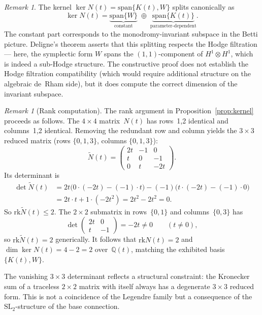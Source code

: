 \documentclass[11pt]{article}
\theoremstyle{plain}
\theoremstyle{definition}
\theoremstyle{remark}
\newtheorem{remark}[theorem]{Remark}
\newcommand{\Q}{\mathbb{Q}}
\newcommand{\rk}{\mathrm{rk}}
\begin{document}
\begin{remark}\label{rem:splitting}
The kernel $\ker N(t) = \mathrm{span}\{K(t), W\}$ splits
canonically as
\[
\ker N(t) = \underbrace{\mathrm{span}\{W\}}_{\text{constant}}
\;\oplus\;
\underbrace{\mathrm{span}\{K(t)\}}_{\text{parameter-dependent}}.
\]
The constant part corresponds to the monodromy-invariant
subspace in the Betti picture.  Deligne's theorem asserts
that this splitting respects the Hodge filtration --- here,
the symplectic form $W$ spans the $(1,1)$-component of
$H^1 \otimes H^1$, which is indeed a sub-Hodge structure.
The constructive proof does not establish the Hodge
filtration compatibility (which would require additional
structure on the algebraic de~Rham side), but it does
compute the correct dimension of the invariant subspace.
\end{remark}

\begin{remark}[Rank computation]\label{rem:rank}
The rank argument in Proposition~\ref{prop:kernel}
proceeds as follows.  The $4 \times 4$ matrix~$N(t)$
has rows~1,2 identical and columns~1,2 identical.
Removing the redundant row and column yields the
$3 \times 3$ reduced matrix (rows $\{0, 1, 3\}$,
columns $\{0, 1, 3\}$):
\[
\tilde{N}(t) =
\begin{pmatrix}
2t & -1 & 0 \\
t  & 0  & -1 \\
0  & t  & -2t
\end{pmatrix}.
\]
Its determinant is
\begin{align*}
\det \tilde{N}(t)
&= 2t \bigl(0 \cdot (-2t) - (-1) \cdot t\bigr)
 - (-1)\bigl(t \cdot (-2t) - (-1) \cdot 0\bigr) \\
&= 2t \cdot t + 1 \cdot (-2t^2) = 2t^2 - 2t^2 = 0.
\end{align*}
So $\rk \tilde{N}(t) \leq 2$.  The $2 \times 2$ submatrix
in rows~$\{0, 1\}$ and columns~$\{0, 3\}$ has
\[
\det \begin{pmatrix} 2t & 0 \\ t & -1 \end{pmatrix}
= -2t \neq 0
\qquad (t \neq 0),
\]
so $\rk \tilde{N}(t) = 2$ generically.  It follows that
$\rk N(t) = 2$ and $\dim \ker N(t) = 4 - 2 = 2$
over~$\Q(t)$, matching the exhibited basis $\{K(t), W\}$.

The vanishing $3 \times 3$ determinant reflects a
structural constraint: the Kronecker sum of a traceless
$2 \times 2$ matrix with itself always has a degenerate
$3 \times 3$ reduced form.  This is not a coincidence
of the Legendre family but a consequence of the
$\mathrm{SL}_2$-structure of the base connection.
\end{remark}
\end{document}
